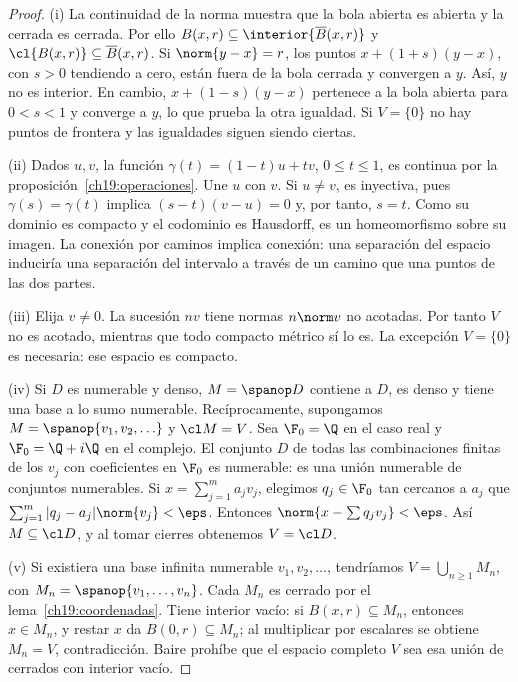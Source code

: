 \begin{proof}
(i) La continuidad de la norma muestra que la bola abierta es abierta y la cerrada es cerrada. Por ello $B(x,r)\subseteq\interior{\overline B(x,r)}$ y $\cl{B(x,r)}\subseteq\overline B(x,r)$. Si $\norm{y-x}=r$, los puntos $x+(1+s)(y-x)$, con $s>0$ tendiendo a cero, están fuera de la bola cerrada y convergen a $y$. Así, $y$ no es interior. En cambio, $x+(1-s)(y-x)$ pertenece a la bola abierta para $0<s<1$ y converge a $y$, lo que prueba la otra igualdad. Si $V=\{0\}$ no hay puntos de frontera y las igualdades siguen siendo ciertas.

(ii) Dados $u,v$, la función $\gamma(t)=(1-t)u+tv$, $0\leq t\leq1$, es continua por la proposición~\ref{ch19:operaciones}. Une $u$ con $v$. Si $u\ne v$, es inyectiva, pues $\gamma(s)=\gamma(t)$ implica $(s-t)(v-u)=0$ y, por tanto, $s=t$. Como su dominio es compacto y el codominio es Hausdorff, es un homeomorfismo sobre su imagen. La conexión por caminos implica conexión: una separación del espacio induciría una separación del intervalo a través de un camino que una puntos de las dos partes.

(iii) Elija $v\ne0$. La sucesión $nv$ tiene normas $n\norm v$ no acotadas. Por tanto $V$ no es acotado, mientras que todo compacto métrico sí lo es. La excepción $V=\{0\}$ es necesaria: ese espacio es compacto.

(iv) Si $D$ es numerable y denso, $M=\spanop D$ contiene a $D$, es denso y tiene una base a lo sumo numerable. Recíprocamente, supongamos $M=\spanop\{v_1,v_2,\ldots\}$ y $\cl M=V$. Sea $\F_0=\Q$ en el caso real y $\F_0=\Q+i\Q$ en el complejo. El conjunto $D$ de todas las combinaciones finitas de los $v_j$ con coeficientes en $\F_0$ es numerable: es una unión numerable de conjuntos numerables. Si $x=\sum_{j=1}^m a_jv_j$, elegimos $q_j\in\F_0$ tan cercanos a $a_j$ que $\sum_{j=1}^m|q_j-a_j|\norm{v_j}<\eps$. Entonces $\norm{x-\sum q_jv_j}<\eps$. Así $M\subseteq\cl D$, y al tomar cierres obtenemos $V=\cl D$.

(v) Si existiera una base infinita numerable $v_1,v_2,\ldots$, tendríamos $V=\bigcup_{n\geq1}M_n$, con $M_n=\spanop\{v_1,\ldots,v_n\}$. Cada $M_n$ es cerrado por el lema~\ref{ch19:coordenadas}. Tiene interior vacío: si $B(x,r)\subseteq M_n$, entonces $x\in M_n$, y restar $x$ da $B(0,r)\subseteq M_n$; al multiplicar por escalares se obtiene $M_n=V$, contradicción. Baire prohíbe que el espacio completo $V$ sea esa unión de cerrados con interior vacío.
\end{proof}

